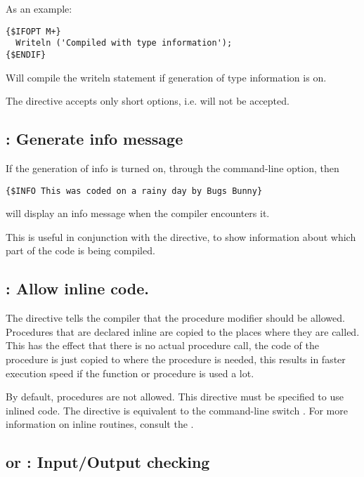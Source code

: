 As an example:
\begin{verbatim}
{$IFOPT M+}
  Writeln ('Compiled with type information');
{$ENDIF}
\end{verbatim}
Will compile the writeln statement if generation of type information is on.

\begin{remark}The  directive accepts only short options,
i.e.  will not be accepted.
\end{remark}

\subsection{ : Generate info message}

If the generation of info is turned on, through the  command-line
option, then
\begin{verbatim}
{$INFO This was coded on a rainy day by Bugs Bunny}
\end{verbatim}
will display an info message when the compiler encounters it.

This is useful in conjunction with the  directive, to show
information about which part of the code is being compiled.

\subsection{ : Allow inline code.}

The  directive tells the compiler that the 
procedure modifier should be allowed. Procedures that are declared inline
are copied to the places where they are called. This has the effect that
there is no actual procedure call, the code of the procedure is just copied
to where the procedure is needed, this results in faster execution speed if
the function or procedure is used a lot.

By default,  procedures are not allowed. This directive must be 
specified to use inlined code. The directive is equivalent to the command-line
 switch . For more information on inline routines, consult the .

\subsection{ or  : Input/Output checking}

